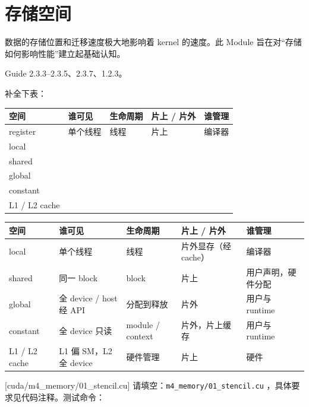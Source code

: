 \documentclass[11pt,a4paper,fontset=fandol]{ctexart}
\begin{document}
\section{存储空间}

数据的存储位置和迁移速度极大地影响着 kernel 的速度。此 Module 旨在对“存储如何影响性能”建立起基础认知。

\begin{reading}
Guide 2.3.3--2.3.5、2.3.7、1.2.3。
\end{reading}

补全下表：

\begin{center}\small
\begin{tabular}{@{}lp{8em}p{7em}p{6em}p{8em}@{}}
\toprule
空间 & 谁可见 & 生命周期 & 片上 / 片外 & 谁管理 \\
\midrule
register & 单个线程 & 线程 & 片上 & 编译器 \\
local &  &  &  &  \\
shared &  &  &  &  \\
global &  &  &  &  \\
constant &  &  &  &  \\
L1 / L2 cache &  &  &  &  \\
\bottomrule
\end{tabular}
\end{center}

\begin{answer}
\begin{center}\small
\begin{tabular}{@{}lp{8em}p{7em}p{6em}p{8em}@{}}
\toprule
空间 & 谁可见 & 生命周期 & 片上 / 片外 & 谁管理 \\
\midrule
local & 单个线程 & 线程 & 片外显存（经 cache） & 编译器 \\
shared & 同一 block & block & 片上 & 用户声明，硬件分配 \\
global & 全 device / host 经 API & 分配到释放 & 片外 & 用户与 runtime \\
constant & 全 device 只读 & module / context & 片外，片上缓存 & 用户与 runtime \\
L1 / L2 cache & L1 偏 SM，L2 全 device & 硬件管理 & 片上 & 硬件 \\
\bottomrule
\end{tabular}
\end{center}
\end{answer}

[cuda/m4\_memory/01\_stencil.cu]
请填空：\texttt{m4\_memory/01\_stencil.cu} ，具体要求见代码注释。测试命令：
\end{document}
